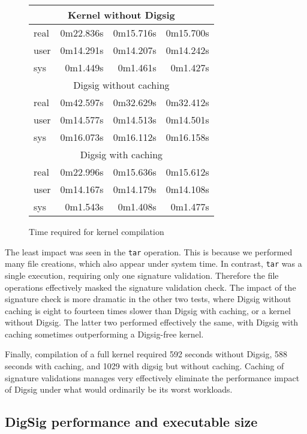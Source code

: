 \documentclass{article}
\begin{document}
\begin{figure}
\begin{center}
\begin{tabular}{|l|r|r|r|}
\hline
\multicolumn{4}{|c|}{Kernel without Digsig} \\
\hline
	real   & 0m22.836s& 0m15.716s &0m15.700s \\
	user   & 0m14.291s& 0m14.207s &0m14.242s \\
	sys    & 0m1.449s &0m1.461s &0m1.427s \\
\hline
\multicolumn{4}{|c|}{Digsig without caching} \\
\hline
	real   & 0m42.597s& 0m32.629s &0m32.412s \\
	user   & 0m14.577s& 0m14.513s &0m14.501s \\
	sys    & 0m16.073s& 0m16.112s &0m16.158s \\
\hline
\multicolumn{4}{|c|}{Digsig with caching} \\
\hline
	real   & 0m22.996s& 0m15.636s &0m15.612s \\
	user   & 0m14.167s& 0m14.179s &0m14.108s \\
	sys    & 0m1.543s &0m1.408s   & 0m1.477s \\
\hline
\end{tabular}
\caption{Time required for kernel compilation}
\label{fig:comptimings}
\end{center}
\end{figure}

The least impact was seen in the {\tt tar} operation.  This is because
we performed many file creations, which also appear under system time.
In contrast, {\tt tar} was a single execution, requiring only one signature
validation.  Therefore the file operations effectively masked the signature
validation check.  The
impact of the signature check is more dramatic in the other two tests,
where Digsig without caching is eight to fourteen times slower than
Digsig with caching, or a kernel without Digsig.  The latter two
performed effectively the same, with Digsig with caching sometimes
outperforming a Digsig-free kernel.

Finally, compilation of a full kernel required 592 seconds without
Digsig, 588 seconds with caching, and 1029 with digsig but without caching.
Caching of signature validations manages very effectively
eliminate the performance impact of Digsig under what would ordinarily
be its worst workloads.

\subsection{DigSig performance and executable size}
\end{document}
